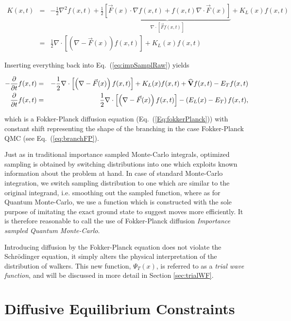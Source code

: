 \begin{eqnarray*}
 K(x, t) &=& - \frac{1}{2}\nabla^2 f(x, t) + \frac{1}{2}\underbrace{\left[\vec F(x)\cdot \nabla f(x, t) + f(x, t)\nabla\cdot \vec F(x)\right]}_{\nabla\cdot\left[\vec F f(x, t)\right]} + K_L(x)f(x, t)\\
         &=& \frac{1}{2}\nabla\cdot \left[\left(\nabla - \vec F(x)\right)f(x, t)\right] + K_L(x)f(x, t)
\end{eqnarray*}

Inserting everything back into Eq.~(\ref{eq:impSamplRaw}) yields

\begin{eqnarray}
 -\frac{\partial}{\partial t}f(x, t) &=& -\frac{1}{2}\nabla\cdot \left[\left(\nabla - \vec F(x)\right)f(x, t)\right] + K_L(x)f(x, t) + {\bf\widehat{V}}f(x, t) - E_Tf(x,t) \nonumber\\
  \frac{\partial}{\partial t}f(x, t)  &=& \frac{1}{2}\nabla\cdot \left[\left(\nabla - \vec F(x)\right)f(x, t)\right] - \left(E_L(x) - E_T\right)f(x, t), 
\end{eqnarray}

which is a Fokker-Planck diffusion equation (Eq.~(\ref{Eq:fokkerPlanck})) with constant shift representing the shape of the branching in the case Fokker-Planck QMC (see Eq.~(\ref{eq:branchFP}).

Just as in traditional importance sampled Monte-Carlo integrals, optimized sampling is obtained by switching distributions into one which exploits known information about the problem at hand. In case of standard Monte-Carlo integration, we switch sampling distribution to one which are similar to the original integrand, i.e. smoothing out the sampled function, where as for Quantum Monte-Carlo, we use a function which is constructed with the sole purpose of imitating the exact ground state to suggest moves more efficiently. It is therefore reasonable to call the use of Fokker-Planck diffusion \textit{Importance sampled Quantum Monte-Carlo}.

Introducing diffusion by the Fokker-Planck equation does not violate the Schrödinger equation, it simply alters the physical interpretation of the distribution of walkers. This new function, $\Psi_T(x)$, is referred to as a \textit{trial wave function}, and will be discussed in more detail in Section \ref{sec:trialWF}.


\section{Diffusive Equilibrium Constraints}

